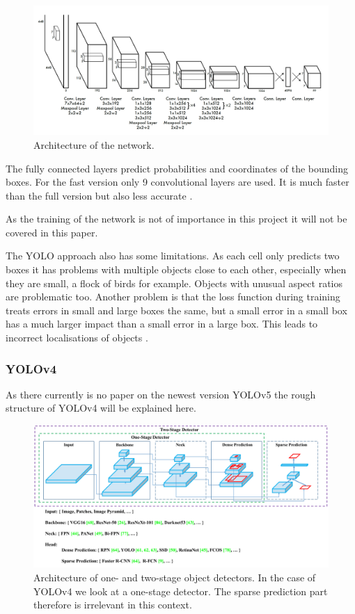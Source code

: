 \begin{figure}[!ht]
\centering
\includegraphics[width=\linewidth]{images/basics/yolo_layers}
\caption{Architecture of the network. \autocite{yolo}}
\label{fig:yolo_layers}
\end{figure}

The fully connected layers predict probabilities and coordinates of the bounding boxes. For the fast version only 9 convolutional layers are used. It is much faster than the full version but also less accurate \autocite{yolo}.

As the training of the network is not of importance in this project it will not be covered in this paper.

The \ac{YOLO} approach also has some limitations. As each cell only predicts two boxes it has problems with multiple objects close to each other, especially when they are small, a flock of birds for example. Objects with unusual aspect ratios are problematic too. Another problem is that the loss function during training treats errors in small and large boxes the same, but a small error in a small box has a much larger impact than a small error in a large box. This leads to incorrect localisations of objects \autocite{yolo}.

\subsubsection{YOLOv4}

As there currently is no paper on the newest version YOLOv5 the rough structure of YOLOv4 will be explained here.

\begin{figure}[!ht]
\centering
\includegraphics[width=\textwidth]{images/basics/yolov4_architecture}
\caption{Architecture of one- and two-stage object detectors. In the case of YOLOv4 we look at a one-stage detector. The sparse prediction part
therefore is irrelevant in this context. \autocite{yolov4}}
\label{fig:yolov4_architecture}
\end{figure}

